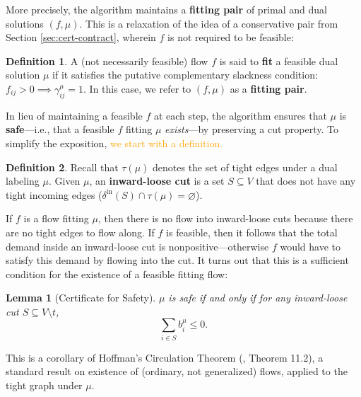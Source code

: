 \documentclass[11pt]{article}
\newtheorem{lemma}[theorem]{Lemma}
\theoremstyle{definition}
\newtheorem{definition}{Definition}[section]
\theoremstyle{definition}
\theoremstyle{definition}
\newcommand{\fu}{f^{\mu}}
\newcommand{\nfiu}{\nabla \fu_i}
\newcommand{\biu}{b_{i}^{\mu}}
\newcommand{\giij}{\gamma_{ij}^{\mu}}
\newcommand{\vnott}{V \setminus t}
\newcommand{\din}{\delta^{\text{in}}}
\newcommand{\dout}{\delta^{\text{out}}}
\DeclareMathOperator{\Def}{Def}
\newcommand{\cbb}[1]{\textcolor{orange}{#1}}
\begin{document}
	More precisely, the algorithm maintains a \textbf{fitting pair}
	of primal and dual solutions $(f,\mu)$. This is a relaxation of the idea of
	a conservative pair from Section \ref{sec:cert-contract}, wherein $f$ is not required
    to be feasible:
	\begin{definition}
	A (not necessarily feasible) flow $f$ is said to \textbf{fit} a feasible dual solution $\mu$
    if it satisfies the putative complementary slackness condition: $f_{ij} > 0 \implies \giij = 1$.
    In this case, we refer to $(f, \mu)$ as a \textbf{fitting pair}.
	\end{definition}
    
	In lieu of maintaining a feasible $f$ at each step,
	the algorithm ensures that $\mu$ is \textbf{safe}---i.e.,
    that a feasible $f$ fitting $\mu$ \emph{exists}---by preserving a
		cut property. To simplify the exposition, \cbb{we start with a definition.}
	\begin{definition}
		Recall that $\tau(\mu)$ denotes the set of tight edges under a dual labeling $\mu$.
		Given $\mu$, an \textbf{inward-loose cut} is a set $S \subseteq V$ that does
		not have any tight incoming edges 
		($\din(S) \cap \tau(\mu) = \varnothing$).
	\end{definition}
	If $f$ is a flow fitting $\mu$, then there is no flow into inward-loose cuts because
	there are no tight edges to flow along.
	If $f$ is feasible, then it follows that the total demand inside an inward-loose
	cut is nonpositive---otherwise $f$ would have to satisfy this demand by flowing
	into the cut.
	It turns out that this is a sufficient condition for the existence
	of a feasible fitting flow:
	\begin{lemma}[Certificate for Safety] \label{lem.safety}
	$\mu$ is safe if and only if for any inward-loose cut $S \subseteq \vnott$,
	\[ \sum_{i \in S} \biu \leq 0. \]
	\end{lemma}
	This is a corollary of Hoffman's Circulation Theorem (\cite{Schrijver2002}, Theorem 11.2),
    a standard result on existence
    of (ordinary, not generalized) flows, applied to the tight graph under $\mu$.
\end{document}
